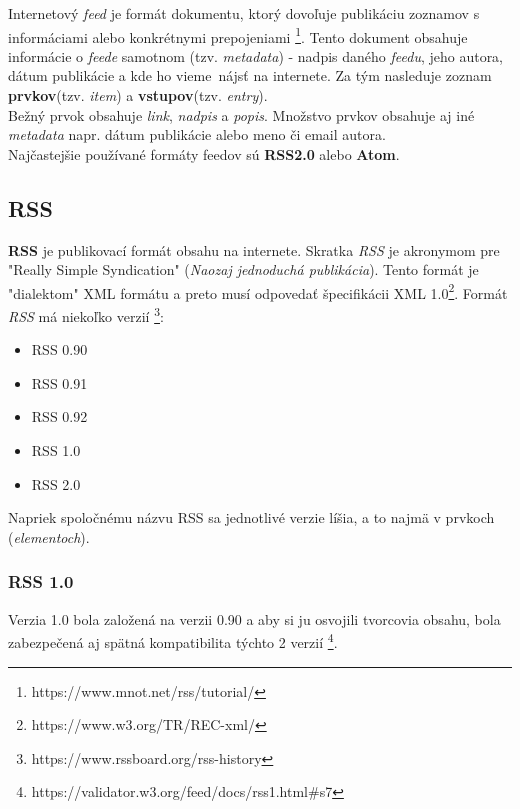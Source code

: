 \documentclass[a4paper, 11pt]{article}
\begin{document}
    Internetový \textit{feed} je formát dokumentu, ktorý dovoľuje publikáciu zoznamov s informáciami alebo konkrétnymi prepojeniami \footnote{https://www.mnot.net/rss/tutorial/}. Tento dokument obsahuje informácie o \textit{feede} samotnom (tzv. \textit{metadata}) - nadpis daného \textit{feedu}, jeho autora, dátum publikácie a kde ho vieme~nájsť na internete. Za tým nasleduje zoznam \textbf{prvkov}(tzv. \textit{item}) a \textbf{vstupov}(tzv. \textit{entry}).\\
    
    Bežný prvok obsahuje \textit{link}, \textit{nadpis} a \textit{popis}. Množstvo prvkov obsahuje aj iné \textit{metadata} napr. dátum publikácie alebo meno či email autora. \\
    
    Najčastejšie používané formáty feedov sú \textbf{RSS2.0} alebo \textbf{Atom}.

    \subsection{RSS}
    \label{RSS}
    
    \textbf{RSS} je publikovací formát obsahu na internete. Skratka \textit{RSS} je akronymom pre "Really Simple Syndication" (\textit{Naozaj jednoduchá publikácia}). Tento formát je "dialektom" XML formátu a preto musí odpovedať špecifikácii XML 1.0\footnote{https://www.w3.org/TR/REC-xml/}.
    Formát \textit{RSS} má niekoľko verzií \footnote{https://www.rssboard.org/rss-history}:
    \begin{itemize}
        \item RSS 0.90
        \item RSS 0.91
        \item RSS 0.92
        \item RSS 1.0
        \item RSS 2.0
    \end{itemize}
    
    Napriek spoločnému názvu RSS sa jednotlivé verzie líšia, a to najmä v prvkoch (\textit{elementoch}). \\
    
    \subsubsection{RSS 1.0}
    Verzia 1.0 bola založená na verzii 0.90 a aby si ju osvojili tvorcovia obsahu, bola zabezpečená aj spätná kompatibilita týchto 2 verzií \footnote{https://validator.w3.org/feed/docs/rss1.html\#s7}. \\
    
\end{document}
